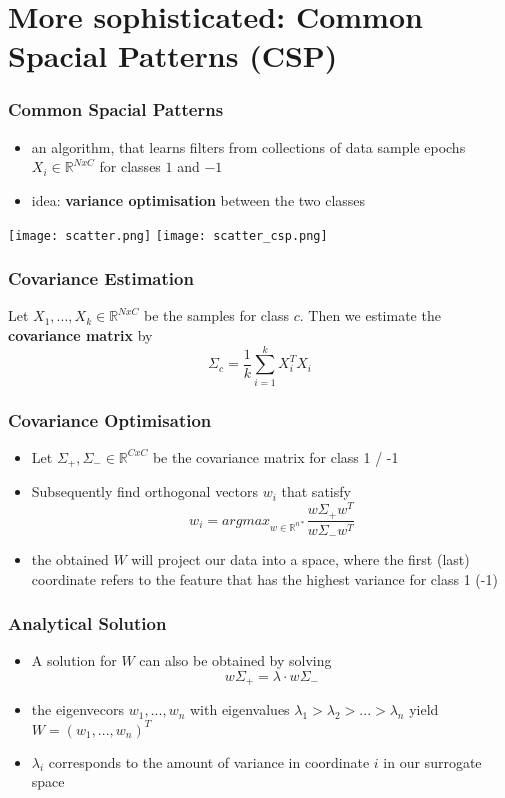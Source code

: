 \documentclass{beamer}
\begin{document}
\section{More sophisticated: Common Spacial Patterns (CSP)}

\begin{frame}
	\frametitle{Common Spacial Patterns}
	\begin{itemize}
	\item an algorithm, that learns filters from collections of data sample epochs $X_i \in \mathds{R}^{NxC}$ for classes $1$ and $-1$
	\item idea: {\bf variance optimisation} between the two classes
	\end{itemize}
	\texttt{[image: scatter.png]}
	\texttt{[image: scatter\_csp.png]}
\end{frame}

\begin{frame}
	\frametitle{Covariance Estimation}
	Let $X_1, ..., X_k \in \mathds{R}^{NxC}$ be the samples for class $c$. Then we estimate the {\bf covariance matrix} by
	\begin{equation}
		\Sigma_c = \frac{1}{k} \sum_{i=1}^{k}X_i^T X_i
	\end{equation} 
\end{frame}



\begin{frame}
	\frametitle{Covariance Optimisation}
	\begin{itemize}
	\item Let $\Sigma_{+}, \Sigma_{-} \in \mathds{R}^{CxC}$ be the covariance matrix for class 1 / -1
	\item Subsequently find orthogonal vectors $w_i$ that satisfy
	\begin{equation}
		w_i = argmax_{w \in \mathds{R}^{n*}} \frac{w \Sigma_{+} w^T}{w \Sigma_{-} w^T}
	\end{equation}
	\item the obtained $W$ will project our data into a space, where the first (last) coordinate refers to the feature
	that has the highest variance for class 1 (-1)
	\end{itemize}
\end{frame}


\begin{frame}
	\frametitle{Analytical Solution}
	\begin{itemize}
	\item A solution for $W$ can also be obtained by solving
	\begin{equation}
		w \Sigma_+ = \lambda \cdot w \Sigma_-
	\end{equation}
	\item the eigenvecors $w_1, ..., w_n$ with eigenvalues $\lambda_1 > \lambda_2 >...> \lambda_n$ yield $W = (w_1, ..., w_n)^T$
	\item $\lambda_i$ corresponds to the amount of variance in coordinate $i$ in our surrogate space
	\end{itemize}
\end{frame}
\end{document}
